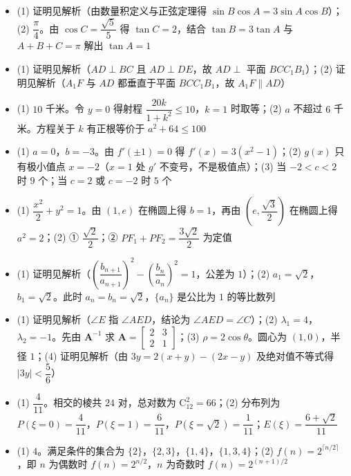 \begin{itemize}[leftmargin=2.6em]
  \item[\textbf{15.}] (1) 证明见解析（由数量积定义与正弦定理得 $\sin B\cos A=3\sin A\cos B$）；(2) $\dfrac\pi4$。由 $\cos C=\dfrac{\sqrt5}5$ 得 $\tan C=2$，结合 $\tan B=3\tan A$ 与 $A+B+C=\pi$ 解出 $\tan A=1$
  \item[\textbf{16.}] (1) 证明见解析（$AD\perp BC$ 且 $AD\perp DE$，故 $AD\perp$ 平面 $BCC_1B_1$）；(2) 证明见解析（$A_1F$ 与 $AD$ 都垂直于平面 $BCC_1B_1$，故 $A_1F\parallel AD$）
  \item[\textbf{17.}] (1) $10$ 千米。令 $y=0$ 得射程 $\dfrac{20k}{1+k^2}\leqslant10$，$k=1$ 时取等；(2) $a$ 不超过 $6$ 千米。方程关于 $k$ 有正根等价于 $a^2+64\leqslant100$
  \item[\textbf{18.}] (1) $a=0$，$b=-3$。由 $f'(\pm1)=0$ 得 $f'(x)=3(x^2-1)$；(2) $g(x)$ 只有极小值点 $x=-2$（$x=1$ 处 $g'$ 不变号，不是极值点）；(3) 当 $-2<c<2$ 时 $9$ 个；当 $c=2$ 或 $c=-2$ 时 $5$ 个
  \item[\textbf{19.}] (1) $\dfrac{x^2}2+y^2=1$。由 $(1,e)$ 在椭圆上得 $b=1$，再由 $\left(e,\dfrac{\sqrt3}2\right)$ 在椭圆上得 $a^2=2$；(2) ① $\dfrac{\sqrt2}2$；② $PF_1+PF_2=\dfrac{3\sqrt2}2$ 为定值
  \item[\textbf{20.}] (1) 证明见解析（$\left(\dfrac{b_{n+1}}{a_{n+1}}\right)^2-\left(\dfrac{b_n}{a_n}\right)^2=1$，公差为 $1$）；(2) $a_1=\sqrt2$，$b_1=\sqrt2$。此时 $a_n=b_n=\sqrt2$，$\{a_n\}$ 是公比为 $1$ 的等比数列
\end{itemize}

\begin{itemize}[leftmargin=2.6em]
  \item[\textbf{21.}] (1) 证明见解析（$\angle E$ 指 $\angle AED$，结论为 $\angle AED=\angle C$）；(2) $\lambda_1=4$，$\lambda_2=-1$。先由 $\boldsymbol A^{-1}$ 求 $\boldsymbol A=\begin{bmatrix}2&3\\2&1\end{bmatrix}$；(3) $\rho=2\cos\theta$。圆心为 $(1,0)$，半径 $1$；(4) 证明见解析（由 $3y=2(x+y)-(2x-y)$ 及绝对值不等式得 $|3y|<\dfrac56$）
  \item[\textbf{22.}] (1) $\dfrac4{11}$。相交的棱共 $24$ 对，总对数为 $\mathrm C_{12}^2=66$；(2) 分布列为 $P(\xi=0)=\dfrac4{11}$，$P(\xi=1)=\dfrac6{11}$，$P(\xi=\sqrt2)=\dfrac1{11}$；$E(\xi)=\dfrac{6+\sqrt2}{11}$
  \item[\textbf{23.}] (1) $4$。满足条件的集合为 $\{2\}$，$\{2,3\}$，$\{1,4\}$，$\{1,3,4\}$；(2) $f(n)=2^{\lceil n/2\rceil}$，即 $n$ 为偶数时 $f(n)=2^{n/2}$，$n$ 为奇数时 $f(n)=2^{(n+1)/2}$
\end{itemize}
